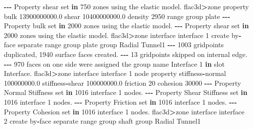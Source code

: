 \documentclass[a4paper, nobind]{templates/ociamthesis}
\newenvironment{Shaded}{\begin{snugshade}}{\end{snugshade}}
\newcommand{\BuiltInTok}[1]{#1}
\newcommand{\DecValTok}[1]{\textcolor[rgb]{0.00,0.00,0.81}{#1}}
\newcommand{\FloatTok}[1]{\textcolor[rgb]{0.00,0.00,0.81}{#1}}
\newcommand{\KeywordTok}[1]{\textcolor[rgb]{0.13,0.29,0.53}{\textbf{#1}}}
\newcommand{\NormalTok}[1]{#1}
\newcommand{\OperatorTok}[1]{\textcolor[rgb]{0.81,0.36,0.00}{\textbf{#1}}}
\newcommand{\StringTok}[1]{\textcolor[rgb]{0.31,0.60,0.02}{#1}}
\renewenvironment{Shaded}
{
  \vspace{10pt}%
  \begin{snugshade}%
}{%
  \end{snugshade}%
  \vspace{8pt}%
}
\begin{document}
\begin{Shaded}
\begin{Highlighting}[]
\OperatorTok{{-}{-}{-}}\NormalTok{ Property shear }\BuiltInTok{set} \KeywordTok{in} \DecValTok{750}\NormalTok{ zones using the elastic model.}
\NormalTok{flac3d}\OperatorTok{\textgreater{}}\NormalTok{zone }\BuiltInTok{property}\NormalTok{ bulk }\FloatTok{13900000000.0}\NormalTok{ shear }\FloatTok{10400000000.0}\NormalTok{ density }\DecValTok{2950} \BuiltInTok{range}\NormalTok{ group }\StringTok{\textquotesingle{}plate\textquotesingle{}}
\OperatorTok{{-}{-}{-}}\NormalTok{ Property bulk }\BuiltInTok{set} \KeywordTok{in} \DecValTok{2000}\NormalTok{ zones using the elastic model.}
\OperatorTok{{-}{-}{-}}\NormalTok{ Property shear }\BuiltInTok{set} \KeywordTok{in} \DecValTok{2000}\NormalTok{ zones using the elastic model.}
\NormalTok{flac3d}\OperatorTok{\textgreater{}}\NormalTok{zone interface }\StringTok{\textquotesingle{}interface 1\textquotesingle{}}\NormalTok{ create by}\OperatorTok{{-}}\NormalTok{face separate }\BuiltInTok{range}\NormalTok{ group }\StringTok{\textquotesingle{}plate\textquotesingle{}}\NormalTok{ group }\StringTok{\textquotesingle{}Radial Tunnel1\textquotesingle{}}
\OperatorTok{{-}{-}{-}} \DecValTok{1003}\NormalTok{ gridpoints duplicated, }\DecValTok{1940}\NormalTok{ surface faces created.}
\OperatorTok{{-}{-}{-}} \DecValTok{13}\NormalTok{ gridpoints skipped on internal edge.}
\OperatorTok{{-}{-}{-}} \DecValTok{970}\NormalTok{ faces on one side were assigned the group name Interface }\DecValTok{1} \KeywordTok{in}\NormalTok{ slot Interface.}
\NormalTok{flac3d}\OperatorTok{\textgreater{}}\NormalTok{zone interface }\StringTok{\textquotesingle{}interface 1\textquotesingle{}}\NormalTok{ node }\BuiltInTok{property}\NormalTok{ stiffness}\OperatorTok{{-}}\NormalTok{normal }\FloatTok{100000000.0}\NormalTok{ stiffness}\OperatorTok{{-}}\NormalTok{shear }\FloatTok{100000000.0}\NormalTok{ friction }\DecValTok{20}\NormalTok{ cohesion }\DecValTok{30000}
\OperatorTok{{-}{-}{-}}\NormalTok{ Property Normal Stiffness }\BuiltInTok{set} \KeywordTok{in} \DecValTok{1016}\NormalTok{ interface }\DecValTok{1}\NormalTok{ nodes.}
\OperatorTok{{-}{-}{-}}\NormalTok{ Property Shear Stiffness }\BuiltInTok{set} \KeywordTok{in} \DecValTok{1016}\NormalTok{ interface }\DecValTok{1}\NormalTok{ nodes.}
\OperatorTok{{-}{-}{-}}\NormalTok{ Property Friction }\BuiltInTok{set} \KeywordTok{in} \DecValTok{1016}\NormalTok{ interface }\DecValTok{1}\NormalTok{ nodes.}
\OperatorTok{{-}{-}{-}}\NormalTok{ Property Cohesion }\BuiltInTok{set} \KeywordTok{in} \DecValTok{1016}\NormalTok{ interface }\DecValTok{1}\NormalTok{ nodes.}
\NormalTok{flac3d}\OperatorTok{\textgreater{}}\NormalTok{zone interface }\StringTok{\textquotesingle{}interface 2\textquotesingle{}}\NormalTok{ create by}\OperatorTok{{-}}\NormalTok{face separate }\BuiltInTok{range}\NormalTok{ group }\StringTok{\textquotesingle{}shaft\textquotesingle{}}\NormalTok{ group }\StringTok{\textquotesingle{}Radial Tunnel1\textquotesingle{}}

\end{Highlighting}
\end{Shaded}
\end{document}
